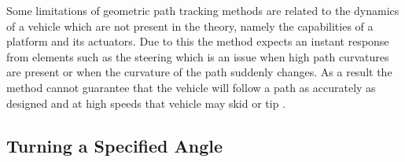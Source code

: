 \documentclass[main.tex]{subfiles}
\begin{document}
Some limitations of geometric path tracking methods are related to the dynamics of a vehicle which are not present in the theory, namely the capabilities of a platform and its actuators. Due to this the method expects an instant response from elements such as the steering which is an issue when high path curvatures are present or when the curvature of the path suddenly changes. As a result the method cannot guarantee that the vehicle will follow a path as accurately as designed and at high speeds that vehicle may skid or tip \parencite{coulter1992}.

\subsection{Turning a Specified Angle}
\end{document}

